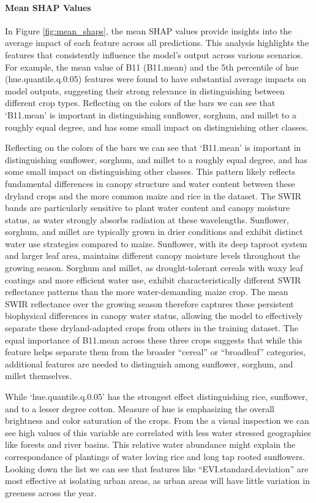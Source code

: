 \documentclass[
  journal,
  twocolumn]{IEEEtran}
\begin{document}
\hypertarget{mean-shap-values}{%
\paragraph{Mean SHAP Values}\label{mean-shap-values}}

In Figure \ref{fig:mean_shaps}, the mean SHAP values provide insights
into the average impact of each feature across all predictions. This
analysis highlights the features that consistently influence the model's
output across various scenarios. For example, the mean value of B11
(B11.mean) and the 5th percentile of hue (hue.quantile.q.0.05) features
were found to have substantial average impacts on model outputs,
suggesting their strong relevance in distinguishing between different
crop types. Reflecting on the colors of the bars we can see that
`B11.mean' is important in distinguishing sunflower, sorghum, and millet
to a roughly equal degree, and has some small impact on distinguishing
other classes.

Reflecting on the colors of the bars we can see that `B11.mean' is
important in distinguishing sunflower, sorghum, and millet to a roughly
equal degree, and has some small impact on distinguishing other classes.
This pattern likely reflects fundamental differences in canopy structure
and water content between these dryland crops and the more common maize
and rice in the dataset. The SWIR bands are particularly sensitive to
plant water content and canopy moisture status, as water strongly
absorbs radiation at these wavelengths. Sunflower, sorghum, and millet
are typically grown in drier conditions and exhibit distinct water use
strategies compared to maize. Sunflower, with its deep taproot system
and larger leaf area, maintains different canopy moisture levels
throughout the growing season. Sorghum and millet, as drought-tolerant
cereals with waxy leaf coatings and more efficient water use, exhibit
characteristically different SWIR reflectance patterns than the more
water-demanding maize crop. The mean SWIR reflectance over the growing
season therefore captures these persistent biophysical differences in
canopy water status, allowing the model to effectively separate these
dryland-adapted crops from others in the training dataset. The equal
importance of B11.mean across these three crops suggests that while this
feature helps separate them from the broader ``cereal'' or ``broadleaf''
categories, additional features are needed to distinguish among
sunflower, sorghum, and millet themselves.

While `hue.quantile.q.0.05' has the strongest effect distinguishing
rice, sunflower, and to a lesser degree cotton. Measure of hue is
emphasizing the overall brightness and color saturation of the crops.
From the a visual inspection we can see high values of this variable are
correlated with less water stressed geographies like forests and river
basins. This relative water abundance might explain the correspondance
of plantings of water loving rice and long tap rooted sunflowers.
Looking down the list we can see that features like
``EVI.standard.deviation'' are most effective at isolating urban areas,
as urban areas will have little variation in greeness across the year.
\end{document}
